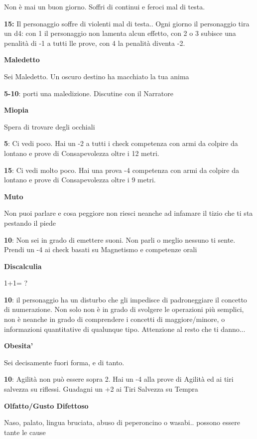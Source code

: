 \documentclass[a4paper,11pt,twoside,openany]{book}
\begin{document}
{Non è mai un buon giorno. Soffri di continui e feroci mal di testa.

\textbf{15:} Il personaggio soffre di violenti mal di testa.. Ogni giorno il personaggio tira un d4: con 1 il personaggio non lamenta alcun effetto, con 2 o 3 subisce una penalità di -1 a tutti lle prove, con 4 la penalità diventa -2.

\textbf{Maledetto}

Sei Maledetto. Un oscuro destino ha macchiato la tua anima

\textbf{5-10}: porti una maledizione. Discutine con il Narratore

\textbf{Miopia}

Spera di trovare degli occhiali

\textbf{5}: Ci vedi poco. Hai un -2 a tutti i check competenza con armi da colpire da lontano e prove di Consapevolezza oltre i 12 metri.

\textbf{15}: Ci vedi molto poco. Hai una prova -4 competenza con armi da colpire da lontano e prove di Consapevolezza oltre i 9 metri. 

\textbf{Muto}

Non puoi parlare e cosa peggiore non riesci neanche ad infamare il
tizio che ti sta pestando il piede

\textbf{10}: Non sei in grado di emettere suoni. Non parli o meglio nessuno ti sente. Prendi un -4 ai check basati su Magnetismo e competenze orali

\textbf{Discalculia}

1+1= ?

\textbf{10}: il personaggio ha un disturbo che gli impedisce di padroneggiare il concetto di numerazione. Non solo non è in grado di svolgere le operazioni più semplici, non è neanche in grado di comprendere i concetti di maggiore/minore, o informazioni quantitative di qualunque tipo. 
Attenzione al resto che ti danno...

\textbf{Obesita'}

Sei decisamente fuori forma, e di tanto.

\textbf{10}: Agilità non può essere sopra 2. Hai un -4 alla prove di Agilità ed ai tiri salvezza su riflessi. Guadagni un +2 ai Tiri Salvezza su Tempra

\textbf{Olfatto/Gusto Difettoso}

Naso, palato, lingua bruciata, abuso di peperoncino o wasabi.. possono essere tante le cause

}
\end{document}
